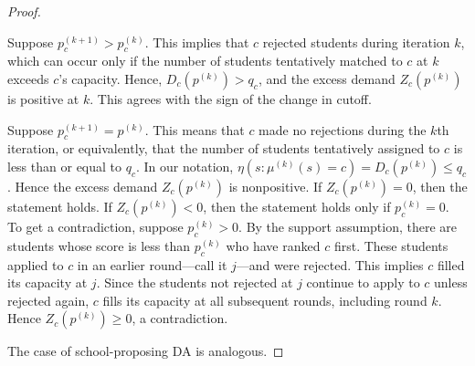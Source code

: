 \documentclass[12pt]{article}
\theoremstyle{definition}
\begin{document}
\begin{proof}
\begin{enumerate}
Suppose $p_c^{(k+1)} > p_c^{(k)}$. This implies that $c$ rejected students during iteration $k$, which can occur only if the number of students tentatively matched to $c$ at $k$ exceeds $c$’s capacity. Hence, $D_c ( p^{(k)}) > q_c$, and the excess demand $Z_c(p^{(k)})$ is positive at $k$. This agrees with the sign of the change in cutoff. 

Suppose $p_c^{(k+1)} = p^{(k)}$. This means that $c$ made no rejections during the $k$th iteration, or equivalently, that the number of students tentatively assigned to $c$ is less than or equal to $q_c$. In our notation, $\eta(s: \mu^{(k)} (s) = c)  = D_c (p^{(k)}) \leq q_c$. Hence the excess demand $Z_c(p^{(k)})$ is nonpositive. If $Z_c(p^{(k)}) = 0$, then the statement holds. If $Z_c(p^{(k)}) < 0$, then the statement holds only if $p_c^{(k)} = 0$. To get a contradiction, suppose $p_c^{(k)} > 0$. By the support assumption, there are students whose score is less than $p_c^{(k)}$ who have ranked $c$ first. These students applied to $c$ in an earlier round---call it $j$---and were rejected. This implies $c$ filled its capacity at $j$. Since the students not rejected at $j$ continue to apply to $c$ unless rejected again, $c$ fills its capacity at all subsequent rounds, including round $k$. Hence $Z_c(p^{(k)}) \geq 0$, a contradiction.
\end{enumerate}
The case of school-proposing DA is analogous. 
\end{proof}
\end{document}
